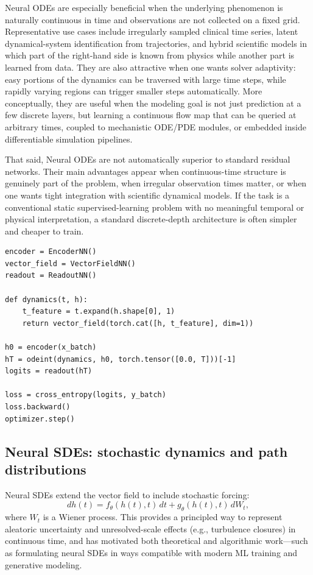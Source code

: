 \documentclass[11pt]{article}
\begin{document}
Neural ODEs are especially beneficial when the underlying phenomenon is naturally continuous in time and observations are not collected on a fixed grid. Representative use cases include irregularly sampled clinical time series, latent dynamical-system identification from trajectories, and hybrid scientific models in which part of the right-hand side is known from physics while another part is learned from data. They are also attractive when one wants solver adaptivity: easy portions of the dynamics can be traversed with large time steps, while rapidly varying regions can trigger smaller steps automatically. More conceptually, they are useful when the modeling goal is not just prediction at a few discrete layers, but learning a continuous flow map that can be queried at arbitrary times, coupled to mechanistic ODE/PDE modules, or embedded inside differentiable simulation pipelines.

That said, Neural ODEs are not automatically superior to standard residual networks. Their main advantages appear when continuous-time structure is genuinely part of the problem, when irregular observation times matter, or when one wants tight integration with scientific dynamical models. If the task is a conventional static supervised-learning problem with no meaningful temporal or physical interpretation, a standard discrete-depth architecture is often simpler and cheaper to train.

\begin{lstlisting}[style=scimlpython,caption={Neural ODE classifier with encoder, continuous-depth block, and readout.},label={lst:neuralode}]
encoder = EncoderNN()
vector_field = VectorFieldNN()
readout = ReadoutNN()

def dynamics(t, h):
    t_feature = t.expand(h.shape[0], 1)
    return vector_field(torch.cat([h, t_feature], dim=1))

h0 = encoder(x_batch)
hT = odeint(dynamics, h0, torch.tensor([0.0, T]))[-1]
logits = readout(hT)

loss = cross_entropy(logits, y_batch)
loss.backward()
optimizer.step()
\end{lstlisting}

\subsection{Neural SDEs: stochastic dynamics and path distributions}

Neural SDEs extend the vector field to include stochastic forcing:
\begin{equation}
dh(t) = f_\theta(h(t),t)\,dt + g_\theta(h(t),t)\,dW_t,
\end{equation}
where $W_t$ is a Wiener process. This provides a principled way to represent aleatoric uncertainty and unresolved-scale effects (e.g., turbulence closures) in continuous time, and has motivated both theoretical and algorithmic work---such as formulating neural SDEs in ways compatible with modern ML training and generative modeling.
\end{document}
